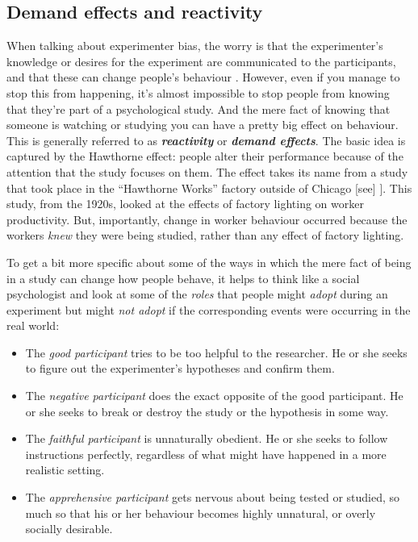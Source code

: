 \documentclass[
]{book}
\providecommand{\tightlist}{%
  \setlength{\itemsep}{0pt}\setlength{\parskip}{0pt}}
\begin{document}
\hypertarget{demand-effects-and-reactivity}{%
\subsection{Demand effects and reactivity}\label{demand-effects-and-reactivity}}

When talking about experimenter bias, the worry is that the experimenter's knowledge or desires for the experiment are communicated to the participants, and that these can change people's behaviour \citep{Rosenthal1966}. However, even if you manage to stop this from happening, it's almost impossible to stop people from knowing that they're part of a psychological study. And the mere fact of knowing that someone is watching or studying you can have a pretty big effect on behaviour. This is generally referred to as \textbf{\emph{reactivity}} or \textbf{\emph{demand effects}}. The basic idea is captured by the Hawthorne effect: people alter their performance because of the attention that the study focuses on them. The effect takes its name from a study that took place in the ``Hawthorne Works'' factory outside of Chicago {[}see{]} \citet{Adair1984}{]}. This study, from the 1920s, looked at the effects of factory lighting on worker productivity. But, importantly, change in worker behaviour occurred because the workers \emph{knew} they were being studied, rather than any effect of factory lighting.

To get a bit more specific about some of the ways in which the mere fact of being in a study can change how people behave, it helps to think like a social psychologist and look at some of the \emph{roles} that people might \emph{adopt} during an experiment but might \emph{not adopt} if the corresponding events were occurring in the real world:

\begin{itemize}
\tightlist
\item
  The \emph{good participant} tries to be too helpful to the researcher. He or she seeks to figure out the experimenter's hypotheses and confirm them.
\item
  The \emph{negative participant} does the exact opposite of the good participant. He or she seeks to break or destroy the study or the hypothesis in some way.
\item
  The \emph{faithful participant} is unnaturally obedient. He or she seeks to follow instructions perfectly, regardless of what might have happened in a more realistic setting.
\item
  The \emph{apprehensive participant} gets nervous about being tested or studied, so much so that his or her behaviour becomes highly unnatural, or overly socially desirable.
\end{itemize}
\end{document}
